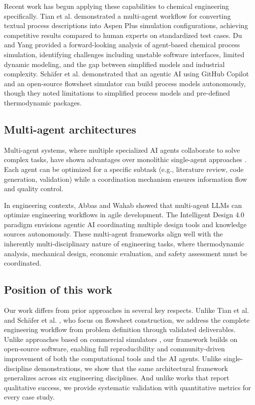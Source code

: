 \documentclass[review,3p]{elsarticle}
\begin{document}
Recent work has begun applying these capabilities to chemical engineering specifically. Tian et al. \citep{Tian2026} demonstrated a multi-agent workflow for converting textual process descriptions into Aspen Plus simulation configurations, achieving competitive results compared to human experts on standardized test cases. Du and Yang \citep{Du2025} provided a forward-looking analysis of agent-based chemical process simulation, identifying challenges including unstable software interfaces, limited dynamic modeling, and the gap between simplified models and industrial complexity. Sch\"{a}fer et al. \citep{Schafer2026} demonstrated that an agentic AI using GitHub Copilot and an open-source flowsheet simulator can build process models autonomously, though they noted limitations to simplified process models and pre-defined thermodynamic packages.

\subsection{Multi-agent architectures}

Multi-agent systems, where multiple specialized AI agents collaborate to solve complex tasks, have shown advantages over monolithic single-agent approaches \citep{Ferrag2025, AbouAli2025}. Each agent can be optimized for a specific subtask (e.g., literature review, code generation, validation) while a coordination mechanism ensures information flow and quality control.

In engineering contexts, Abbas and Wahab \citep{Abbas2024} showed that multi-agent LLMs can optimize engineering workflows in agile development. The Intelligent Design 4.0 paradigm \citep{Jiang2025} envisions agentic AI coordinating multiple design tools and knowledge sources autonomously. These multi-agent frameworks align well with the inherently multi-disciplinary nature of engineering tasks, where thermodynamic analysis, mechanical design, economic evaluation, and safety assessment must be coordinated.

\subsection{Position of this work}

Our work differs from prior approaches in several key respects. Unlike Tian et al. \citep{Tian2026} and Sch\"{a}fer et al. \citep{Schafer2026}, who focus on flowsheet construction, we address the complete engineering workflow from problem definition through validated deliverables. Unlike approaches based on commercial simulators \citep{Du2025, Liang2026}, our framework builds on open-source software, enabling full reproducibility and community-driven improvement of both the computational tools and the AI agents. Unlike single-discipline demonstrations, we show that the same architectural framework generalizes across six engineering disciplines. And unlike works that report qualitative success, we provide systematic validation with quantitative metrics for every case study.
\end{document}
